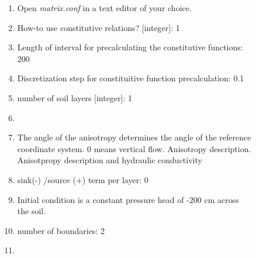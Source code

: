 \documentclass[
10pt, %
a4paper, %
oneside, %
headinclude,footinclude, %
BCOR5mm, %
]{scrartcl}
\begin{document}
\begin{figure}[!h]
\begin{enumerate}
\item Open \emph{matrix.conf} in a text editor of your choice. 
\item How-to use constitutive relations? [integer]: 1
\item Length of interval for precalculating the constitutive functions: 200
\item Discretization step for constituitive function precalculation: 0.1
\item number of soil layers [integer]: 1
\item {}
\item The angle of the anisotropy determines the angle of the reference coordinate system. 0 means vertical flow. Anisotropy description. Anisotpropy description and hydraulic conductivity\\ 
\item sink(-) /source (+) term per layer: 0
\item Initial condition is a constant pressure head of -200 cm across the soil. 
\item number of boundaries: 2
\item {}
\end{enumerate}
\end{figure}
\end{document}
